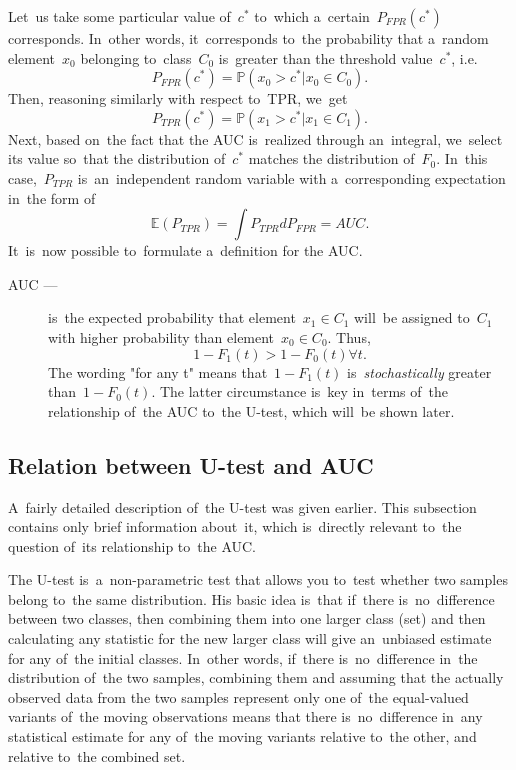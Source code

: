 \documentclass[]{scrreprt}
\begin{document}
Let~us take some particular value of~$c^{*}$ to~which a~certain~$P_{FPR}(c^{*})$ corresponds. In~other words, it~corresponds to~the probability that a~random element~$x_{0}$ belonging to~class~$C_{0}$ is~greater than the threshold value~$c^{*}$, i.e.
\begin{equation}\label{eq:AUC-computation-3}
P_{FPR}(c^{*}) = \mathbb{P}(x_{0}>c^{*}|x_{0} \in C_{0}).
\end{equation}
Then, reasoning similarly with respect to~TPR, we~get
\begin{equation}\label{eq:AUC-computation-4}
P_{TPR}(c^{*}) = \mathbb{P}(x_{1}>c^{*}|x_{1} \in C_{1}).
\end{equation}
Next, based on~the fact that the AUC is~realized through an~integral, we~select its value so~that the distribution of~$c^{*}$ matches the distribution of~$F_{0}$. In~this case,~$P_{TPR}$ is~an~independent random variable with a~corresponding expectation in~the form of
\begin{equation}\label{eq:AUC-computation-integral}
\mathbb{E}(P_{TPR}) = \int P_{TPR} d P_{FPR} = AUC.
\end{equation}
It~is~now possible to~formulate a~definition for the AUC.
\begin{description}
	\item[AUC ---] is~the expected probability that element~$x_{1} \in C_{1}$ will~be assigned to~$C_{1}$ with higher probability than element~$x_{0} \in C_{0}$. Thus,
	\begin{equation}\label{eq:AUC-definition}
	1-F_{1}(t)>1-F_{0}(t) \forall t.
	\end{equation}
	The wording "for any t" means that~$1-F_{1}(t)$ is~\emph{stochastically} greater than~$1-F_{0}(t)$. The latter circumstance is~key in~terms of~the relationship of~the AUC to~the U-test, which will~be shown later.
\end{description}
%
\subsection{Relation between U-test and AUC}\label{U-test&AUC-relation}
A~fairly detailed description of~the U-test was given earlier. This subsection contains only brief information about~it, which is~directly relevant to~the question of~its relationship to~the AUC.

The U-test is~a~non-parametric test that allows you to~test whether two samples belong to~the same distribution. His basic idea is~that if~there is~no~difference between two classes, then combining them into one larger class (set) and then calculating any statistic for the new larger class will give an~unbiased estimate for any of~the initial classes. In~other words, if~there is~no~difference in~the distribution of~the two samples, combining them and assuming that the actually observed data from the two samples represent only one of~the equal-valued variants of~the moving observations means that there is~no~difference in~any statistical estimate for any of~the moving variants relative to~the other, and relative to~the combined set.
\end{document}
